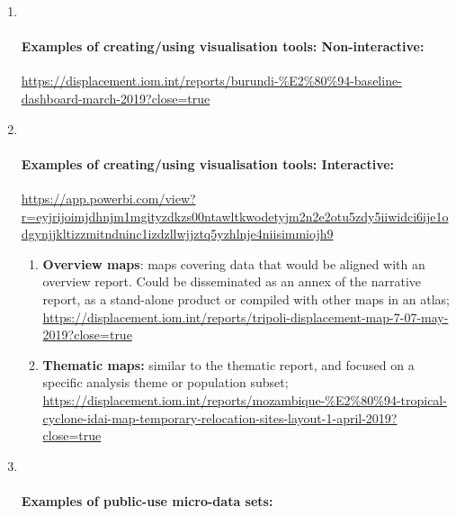 \documentclass[
]{article}
\begin{document}
\begin{enumerate}
\def\labelenumi{\arabic{enumi})}
\setcounter{enumi}{8}
\item ~
  \hypertarget{examples-of-creatingusing-visualisation-tools-non-interactive-1}{%
  \paragraph{Examples of creating/using visualisation tools: Non-interactive:}\label{examples-of-creatingusing-visualisation-tools-non-interactive-1}}

  \url{https://displacement.iom.int/reports/burundi-\%E2\%80\%94-baseline-dashboard-march-2019?close=true}
\item ~
  \hypertarget{examples-of-creatingusing-visualisation-tools-interactive-1}{%
  \paragraph{Examples of creating/using visualisation tools: Interactive:}\label{examples-of-creatingusing-visualisation-tools-interactive-1}}

  \url{https://app.powerbi.com/view?r=eyjrijoimjdhnjm1mgityzdkzs00ntawltkwodetyjm2n2e2otu5zdy5iiwidci6ije1odgynjjkltizzmitndninc1izdzllwjjztq5yzhlnje4niisimmiojh9}

  \begin{enumerate}
  \def\labelenumii{\arabic{enumii}.}
  \setcounter{enumii}{10}
  \item
    \textbf{Overview maps}: maps covering data that would be aligned with
    an overview report. Could be disseminated as an annex of the
    narrative report, as a stand-alone product or compiled with
    other maps in an atlas;
    \url{https://displacement.iom.int/reports/tripoli-displacement-map-7-07-may-2019?close=true}
  \item
    \textbf{Thematic maps:} similar to the thematic report, and focused
    on a specific analysis theme or population subset;
    \url{https://displacement.iom.int/reports/mozambique-\%E2\%80\%94-tropical-cyclone-idai-map-temporary-relocation-sites-layout-1-april-2019?close=true}
  \end{enumerate}
\item ~
  \hypertarget{examples-of-public-use-micro-data-sets-1}{%
  \paragraph{Examples of public-use micro-data sets:}\label{examples-of-public-use-micro-data-sets-1}}
\end{enumerate}
\end{document}
